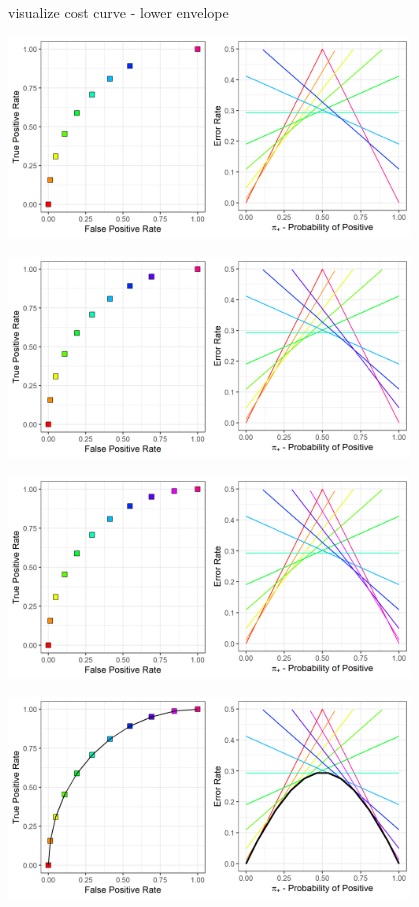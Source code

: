 \begin{frame}{visualize cost curve - lower envelope}
{\begin{center}
    \end{center}  
  }
   {
    \begin{center}
      \includegraphics[width=0.8\textwidth]{figure/lower_envelope_8.png}
    \end{center}  
  }
   {
    \begin{center}
      \includegraphics[width=0.8\textwidth]{figure/lower_envelope_9.png}
    \end{center}  
  }
   {
    \begin{center}
      \includegraphics[width=0.8\textwidth]{figure/lower_envelope_10.png}
    \end{center}  
  }
   {
    \begin{center}
      \includegraphics[width=0.8\textwidth]{figure/lower_envelope_11.png}
    \end{center}  
  }
	
\end{frame}

